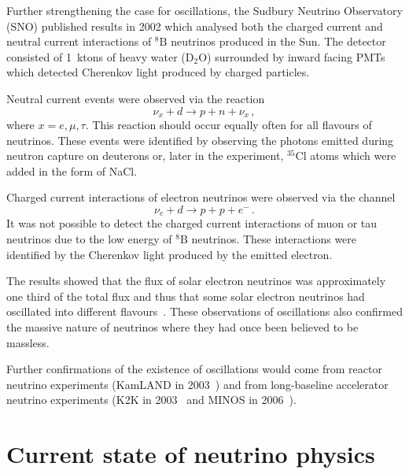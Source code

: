 Further strengthening the case for oscillations, the Sudbury Neutrino Observatory (SNO) published results in 2002 which analysed both the charged current and neutral current interactions of $^{8}\text{B}$ neutrinos produced in the Sun.
The detector consisted of 1~ktons of heavy water ($\text{D}_{2}\text{O}$) surrounded by inward facing PMTs which detected Cherenkov light produced by charged particles.

Neutral current events were observed via the reaction
\begin{equation}
  \nu_{x} + d \rightarrow p + n + \nu_{x} \, ,
\end{equation}
where $x = e, \mu, \tau$.
This reaction should occur equally often for all flavours of neutrinos.
These events were identified by observing the photons emitted during neutron capture on deuterons or, later in the experiment, $^{35}\text{Cl}$ atoms which were added in the form of NaCl.  

Charged current interactions of electron neutrinos were observed via the channel
\begin{equation}
  \nu_{e} + d \rightarrow p + p + e^{-} \, .
\end{equation}
It was not possible to detect the charged current interactions of muon or tau neutrinos due to the low energy of $^{8}\text{B}$ neutrinos.
These interactions were identified by the Cherenkov light produced by the emitted electron.

The results showed that the flux of solar electron neutrinos was approximately one third of the total flux and thus that some solar electron neutrinos had oscillated into different flavours~\cite{SNO}.
These observations of oscillations also confirmed the massive nature of neutrinos where they had once been believed to be massless.

Further confirmations of the existence of oscillations would come from reactor neutrino experiments (KamLAND in 2003~\cite{kamland2003}) and from long-baseline accelerator neutrino experiments (K2K in 2003~\cite{k2kDisapp} and MINOS in 2006~\cite{minosDisapp}).

\section{Current state of neutrino physics}
\label{sec:theory:currentState}


